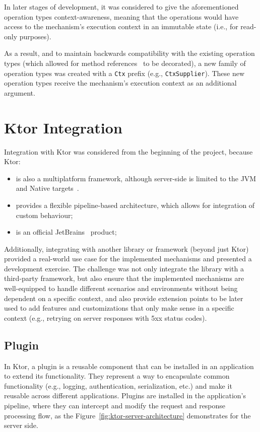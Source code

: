 In later stages of development, it was considered to give the aforementioned operation types context-awareness,
meaning that the operations would have access to the mechanism's execution context in an immutable state
(i.e., for read-only purposes).

As a result, and to maintain backwards compatibility with the existing operation types (which allowed for method references~\cite{java-method-references} to be decorated), a new family of operation types was created with a \texttt{Ctx} prefix (e.g., \texttt{CtxSupplier}).
These new operation types receive the mechanism's execution context as an additional argument.


\section{Ktor Integration}\label{sec:ktor-integration}

Integration with Ktor was considered from the beginning of the project, because Ktor:
\begin{itemize}
    \item is also a multiplatform framework, although server-side is limited to the JVM and Native targets~\cite{ktor-server-platforms}.
    \item provides a flexible pipeline-based architecture, which allows for integration of custom behaviour;
    \item is an official JetBrains~\cite{jetbrains} product;
\end{itemize}

Additionally, integrating with another library or framework (beyond just Ktor) provided a real-world use case for the implemented mechanisms and presented a development exercise.
The challenge was not only integrate the library with a third-party framework, but also ensure that the implemented mechanisms are well-equipped to handle different scenarios and environments without being dependent on a specific context, and also provide extension points to be later used to add features and customizations that only make sense in a specific context (e.g., retrying on server responses with 5xx status codes).

\subsection{Plugin}\label{subsec:plugin}

In Ktor, a plugin is a reusable component that can be installed in an application to extend its functionality.
They represent a way to encapsulate common functionality (e.g., logging, authentication, serialization, etc.) and make it reusable across different applications.
Plugins are installed in the application's pipeline, where they can intercept and modify the request and response processing flow, as the Figure~\ref{fig:ktor-server-architecture} demonstrates for the server side.

